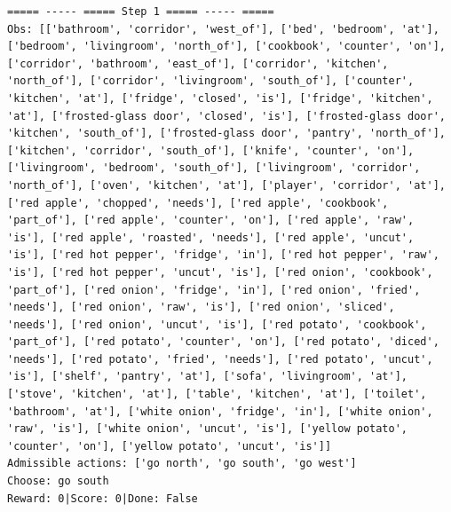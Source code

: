 \documentclass[11pt]{article}
\begin{document}
\begin{lstlisting}
===== ----- ===== Step 1 ===== ----- =====
Obs: [['bathroom', 'corridor', 'west_of'], ['bed', 'bedroom', 'at'], ['bedroom', 'livingroom', 'north_of'], ['cookbook', 'counter', 'on'], ['corridor', 'bathroom', 'east_of'], ['corridor', 'kitchen', 'north_of'], ['corridor', 'livingroom', 'south_of'], ['counter', 'kitchen', 'at'], ['fridge', 'closed', 'is'], ['fridge', 'kitchen', 'at'], ['frosted-glass door', 'closed', 'is'], ['frosted-glass door', 'kitchen', 'south_of'], ['frosted-glass door', 'pantry', 'north_of'], ['kitchen', 'corridor', 'south_of'], ['knife', 'counter', 'on'], ['livingroom', 'bedroom', 'south_of'], ['livingroom', 'corridor', 'north_of'], ['oven', 'kitchen', 'at'], ['player', 'corridor', 'at'], ['red apple', 'chopped', 'needs'], ['red apple', 'cookbook', 'part_of'], ['red apple', 'counter', 'on'], ['red apple', 'raw', 'is'], ['red apple', 'roasted', 'needs'], ['red apple', 'uncut', 'is'], ['red hot pepper', 'fridge', 'in'], ['red hot pepper', 'raw', 'is'], ['red hot pepper', 'uncut', 'is'], ['red onion', 'cookbook', 'part_of'], ['red onion', 'fridge', 'in'], ['red onion', 'fried', 'needs'], ['red onion', 'raw', 'is'], ['red onion', 'sliced', 'needs'], ['red onion', 'uncut', 'is'], ['red potato', 'cookbook', 'part_of'], ['red potato', 'counter', 'on'], ['red potato', 'diced', 'needs'], ['red potato', 'fried', 'needs'], ['red potato', 'uncut', 'is'], ['shelf', 'pantry', 'at'], ['sofa', 'livingroom', 'at'], ['stove', 'kitchen', 'at'], ['table', 'kitchen', 'at'], ['toilet', 'bathroom', 'at'], ['white onion', 'fridge', 'in'], ['white onion', 'raw', 'is'], ['white onion', 'uncut', 'is'], ['yellow potato', 'counter', 'on'], ['yellow potato', 'uncut', 'is']]
Admissible actions: ['go north', 'go south', 'go west']
Choose: go south
Reward: 0|Score: 0|Done: False


\end{lstlisting}
\end{document}
